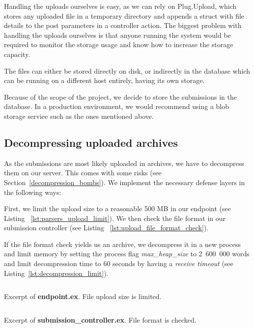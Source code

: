 Handling the uploads ourselves is easy, as we can rely on Plug.Upload, which stores any uploaded file in a temporary directory and appends a struct with file details to the post parameters in a controller action. The biggest problem with handling the uploads ourselves is that anyone running the system would be required to monitor the storage usage and know how to increase the storage capacity.

The files can either be stored directly on disk, or indirectly in the database which can be running on a different host entirely, having its own storage.

Because of the scope of the project, we decide to store the submissions in the database. In a production environment, we would recommend using a blob storage service such as the ones mentioned above.

\subsection*{Decompressing uploaded archives}

As the submissions are most likely uploaded in archives, we have to decompress them on our server. This comes with some risks (see Section~\ref{decompression_bombs}). We implement the necessary defense layers in the following ways:

First, we limit the upload size to a reasonable 500 MB in our endpoint (see Listing ~\ref{lst:parsers_upload_limit}). We then check the file format in our submission controller (see Listing ~\ref{lst:upload_file_format_check}).


If the file format check yields us an archive, we decompress it in a new process and limit memory by setting the process flag \emph{max\_heap\_size} to 2~600~000 words and limit decompression time to 60 seconds by having a \emph{receive timeout} (see Listing~\ref{lst:decompression_limit}).

\begin{listing}
    \inputminted[firstline=43,lastline=46]{elixir}{code/server/lib/thesis_web/endpoint.ex}
    \caption{Excerpt of \textbf{endpoint.ex}. File upload size is limited.}
    \label{lst:parsers_upload_limit}
\end{listing}

\begin{listing}
    \inputminted[firstline=73,lastline=82]{elixir}{code/server/lib/thesis_web/controllers/submission_controller.ex}
    \caption{Excerpt of \textbf{submission\_controller.ex}. File format is checked.}
    \label{lst:upload_file_format_check}
\end{listing}

